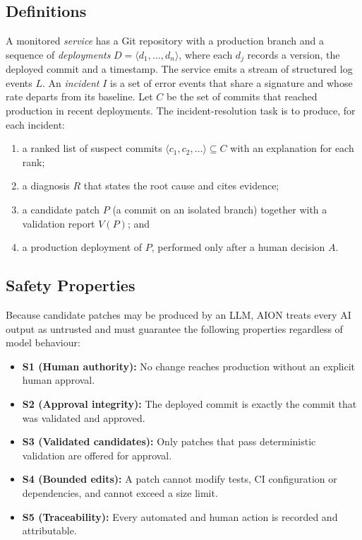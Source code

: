 \documentclass[conference]{IEEEtran}
\begin{document}
\subsection{Definitions}
A monitored \emph{service} has a Git repository with a production branch and a sequence of \emph{deployments} $D = \langle d_1, \dots, d_n \rangle$, where each $d_j$ records a version, the deployed commit and a timestamp. The service emits a stream of structured log events $L$. An \emph{incident} $I$ is a set of error events that share a signature and whose rate departs from its baseline. Let $C$ be the set of commits that reached production in recent deployments. The incident-resolution task is to produce, for each incident:
\begin{enumerate}
\item a ranked list of suspect commits $\langle c_1, c_2, \dots \rangle \subseteq C$ with an explanation for each rank;
\item a diagnosis $R$ that states the root cause and cites evidence;
\item a candidate patch $P$ (a commit on an isolated branch) together with a validation report $V(P)$; and
\item a production deployment of $P$, performed only after a human decision $A$.
\end{enumerate}

\subsection{Safety Properties}
Because candidate patches may be produced by an LLM, AION treats every AI output as untrusted and must guarantee the following properties regardless of model behaviour:
\begin{itemize}
\item \textbf{S1 (Human authority):} No change reaches production without an explicit human approval.
\item \textbf{S2 (Approval integrity):} The deployed commit is exactly the commit that was validated and approved.
\item \textbf{S3 (Validated candidates):} Only patches that pass deterministic validation are offered for approval.
\item \textbf{S4 (Bounded edits):} A patch cannot modify tests, CI configuration or dependencies, and cannot exceed a size limit.
\item \textbf{S5 (Traceability):} Every automated and human action is recorded and attributable.
\end{itemize}
\end{document}
